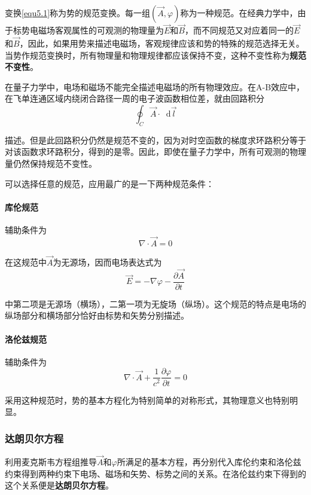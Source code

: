 \documentclass[UTF8]{ctexart}
\begin{document}
\noindent 变换\autoref{equ5.1}称为势的规范变换。每一组$(\vec{A},\varphi)$称为一种规范。在经典力学中，由于标势电磁场客观属性的可观测的物理量为$\vec{E}$和$\vec{B}$，而不同规范又对应着同一的$\vec{E}$和$\vec{B}$，因此，如果用势来描述电磁场，客观规律应该和势的特殊的规范选择无关。当势作规范变换时，所有物理量和物理规律都应该保持不变，这种不变性称为\textbf{规范不变性}。

    在量子力学中，电场和磁场不能完全描述电磁场的所有物理效应。在A-B效应中，在飞单连通区域内绕闭合路径一周的电子波函数相位差，就由回路积分
    \begin{equation}
        \oint_C \vec{A} \cdot \mathop{}\!\mathrm{d} \vec{l}
    \end{equation}

\noindent 描述。但是此回路积分仍然是规范不变的，因为对时空函数的梯度求环路积分等于对该函数求环路积分，得到的是零。因此，即使在量子力学中，所有可观测的物理量仍然保持规范不变性。

    可以选择任意的规范，应用最广的是一下两种规范条件：
    \paragraph{库伦规范}
    辅助条件为
    \begin{equation}
        \nabla \cdot \vec{A} = 0
    \end{equation}

\noindent 在这规范中$\vec{A}$为无源场，因而电场表达式为
\begin{equation}
    \vec{E} = - \nabla \varphi - \frac{\partial \vec{A}}{\partial t}
\end{equation}

\noindent 中第二项是无源场（横场），二第一项为无旋场（纵场）。这个规范的特点是电场的纵场部分和横场部分恰好由标势和矢势分别描述。

    \paragraph{洛伦兹规范}
    辅助条件为
    \begin{equation}
        \nabla \cdot \vec{A} + \frac{1}{c^2} \frac{\partial \varphi}{\partial t} = 0
    \end{equation}

\noindent 采用这种规范时，势的基本方程化为特别简单的对称形式，其物理意义也特别明显。

    \subsubsection{达朗贝尔方程}
    利用麦克斯韦方程组推导$\vec{A}$和$\varphi$所满足的基本方程，再分别代入库伦约束和洛伦兹约束得到两种约束下电场、磁场和矢势、标势之间的关系。在洛伦兹约束下得到的这个关系便是\textbf{达朗贝尔方程}。
\end{document}
